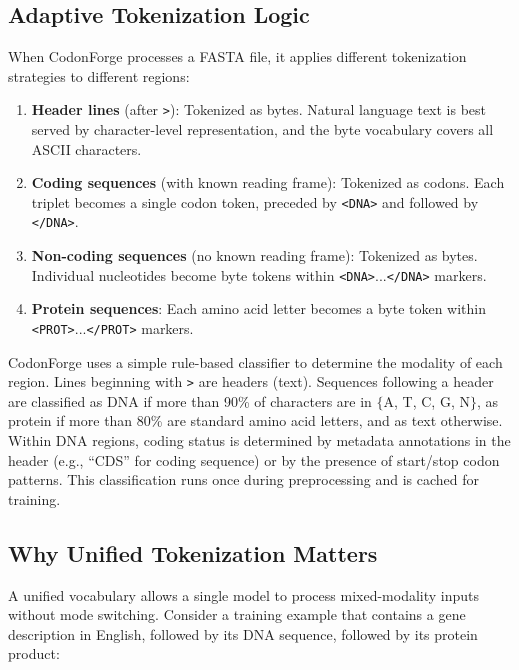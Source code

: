 \subsection{Adaptive Tokenization Logic}

When CodonForge processes a FASTA file, it applies different tokenization strategies to different regions:

\begin{enumerate}[leftmargin=1.5em]
  \item \textbf{Header lines} (after \texttt{>}): Tokenized as bytes. Natural language text is best served by character-level representation, and the byte vocabulary covers all ASCII characters.
  \item \textbf{Coding sequences} (with known reading frame): Tokenized as codons. Each triplet becomes a single codon token, preceded by \texttt{<DNA>} and followed by \texttt{</DNA>}.
  \item \textbf{Non-coding sequences} (no known reading frame): Tokenized as bytes. Individual nucleotides become byte tokens within \texttt{<DNA>}...\texttt{</DNA>} markers.
  \item \textbf{Protein sequences}: Each amino acid letter becomes a byte token within \texttt{<PROT>}...\texttt{</PROT>} markers.
\end{enumerate}

\begin{implnote}
CodonForge uses a simple rule-based classifier to determine the modality of each region. Lines beginning with \texttt{>} are headers (text). Sequences following a header are classified as DNA if more than 90\% of characters are in $\{$A, T, C, G, N$\}$, as protein if more than 80\% are standard amino acid letters, and as text otherwise. Within DNA regions, coding status is determined by metadata annotations in the header (e.g., ``CDS'' for coding sequence) or by the presence of start/stop codon patterns. This classification runs once during preprocessing and is cached for training.
\end{implnote}

\subsection{Why Unified Tokenization Matters}

A unified vocabulary allows a single model to process mixed-modality inputs without mode switching. Consider a training example that contains a gene description in English, followed by its DNA sequence, followed by its protein product:

